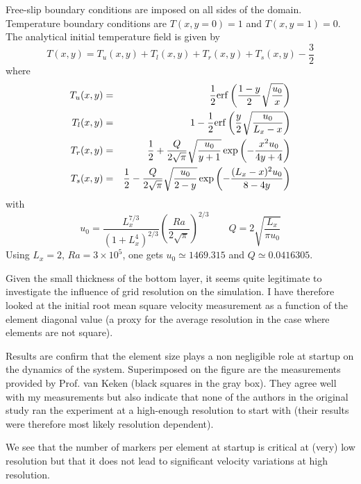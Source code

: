 Free-slip boundary conditions are imposed on all sides of the domain.
Temperature boundary conditions are $T(x,y=0)=1$ and 
$T(x,y=1)=0$. The analytical initial temperature field is given by 
\begin{equation}
T(x,y)=T_u(x,y)+T_l(x,y)+T_r(x,y)+T_s(x,y)-\frac{3}{2}
\end{equation}
where
\begin{eqnarray}
T_u(x,y) &=& \frac{1}{2} {\rm erf} \left(  \frac{1-y}{2} \sqrt{\frac{u_0}{x}} \right) \nonumber\\
T_l(x,y) &=& 1-\frac{1}{2} {\rm erf} \left( \frac{y}{2} \sqrt{\frac{u_0}{L_x-x}} \right) \nonumber\\
T_r(x,y) &=& \frac{1}{2} + \frac{Q}{2\sqrt{\pi}} \sqrt{\frac{u_0}{y+1}} \exp \left(  -\frac{x^2u_0}{4y+4} \right) \nonumber\\
T_s(x,y) &=& \frac{1}{2} - \frac{Q}{2\sqrt{\pi}} \sqrt{\frac{u_0}{2-y}} \exp \left(  -\frac{(L_x-x)^2u_0}{8-4y} \right) 
\end{eqnarray}
with
\begin{equation}
u_0=\frac{L_x^{7/3}}{(1+L_x^4)^{2/3}} \left(\frac{Ra}{2\sqrt{\pi}} \right)^{2/3}
\quad\quad
Q=2\sqrt{\frac{L_x}{\pi u_0}}
\end{equation}
Using $L_x=2$, $Ra=3\times10^5$, one gets
$u_0 \simeq 1469.315 $ and $Q\simeq 0.0416305$.

Given the small thickness of the bottom layer, it seems quite legitimate to 
investigate the influence of grid resolution on the simulation. 
I have therefore looked at the initial root mean square velocity measurement 
as a function of the element diagonal value (a proxy for the average resolution
in the case where elements are not square). 


Results are confirm that 
the element size plays a non negligible role at startup on the dynamics of the system.
Superimposed on the figure are the measurements provided by Prof. van Keken (black squares
in the gray box).
They agree well with my measurements but also indicate that 
none of the authors in the original study ran the experiment at a high-enough resolution
to start with (their results were therefore most likely resolution dependent).

We see that the number of markers per element at startup is critical at 
(very) low resolution but that it does not lead to 
significant velocity variations at high resolution. 

